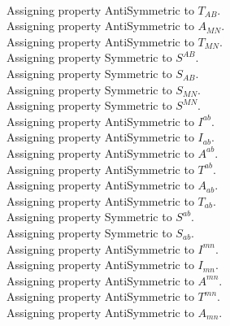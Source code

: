 \documentclass[11pt]{article}
\begin{document}
\\
Assigning property AntiSymmetric to ${T}_{A B}$.
\\
Assigning property AntiSymmetric to ${A}_{M N}$.
\\
Assigning property AntiSymmetric to ${T}_{M N}$.
\\
Assigning property Symmetric to ${S}^{A B}$.
\\
Assigning property Symmetric to ${S}_{A B}$.
\\
Assigning property Symmetric to ${S}_{M N}$.
\\
Assigning property Symmetric to ${S}^{M N}$.
\\
Assigning property AntiSymmetric to ${I}^{a b}$.
\\
Assigning property AntiSymmetric to ${I}_{a b}$.
\\
Assigning property AntiSymmetric to ${A}^{a b}$.
\\
Assigning property AntiSymmetric to ${T}^{a b}$.
\\
Assigning property AntiSymmetric to ${A}_{a b}$.
\\
Assigning property AntiSymmetric to ${T}_{a b}$.
\\
Assigning property Symmetric to ${S}^{a b}$.
\\
Assigning property Symmetric to ${S}_{a b}$.
\\
Assigning property AntiSymmetric to ${I}^{m n}$.
\\
Assigning property AntiSymmetric to ${I}_{m n}$.
\\
Assigning property AntiSymmetric to ${A}^{m n}$.
\\
Assigning property AntiSymmetric to ${T}^{m n}$.
\\
Assigning property AntiSymmetric to ${A}_{m n}$.
\\
\end{document}
